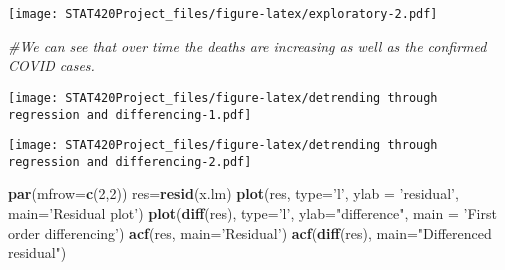 \documentclass[]{article}
\newenvironment{Shaded}{\begin{snugshade}}{\end{snugshade}}
\newcommand{\CommentTok}[1]{\textcolor[rgb]{0.56,0.35,0.01}{\textit{#1}}}
\newcommand{\DataTypeTok}[1]{\textcolor[rgb]{0.13,0.29,0.53}{#1}}
\newcommand{\DecValTok}[1]{\textcolor[rgb]{0.00,0.00,0.81}{#1}}
\newcommand{\KeywordTok}[1]{\textcolor[rgb]{0.13,0.29,0.53}{\textbf{#1}}}
\newcommand{\NormalTok}[1]{#1}
\newcommand{\OperatorTok}[1]{\textcolor[rgb]{0.81,0.36,0.00}{\textbf{#1}}}
\newcommand{\StringTok}[1]{\textcolor[rgb]{0.31,0.60,0.02}{#1}}
\begin{document}
\texttt{[image: STAT420Project\_files/figure-latex/exploratory-2.pdf]}

\begin{Shaded}
\begin{Highlighting}[]
\CommentTok{#We can see that over time the deaths are increasing as well as the confirmed COVID cases. }
\end{Highlighting}
\end{Shaded}

\begin{Shaded}
\end{Shaded}

\texttt{[image: STAT420Project\_files/figure-latex/detrending through regression and differencing-1.pdf]}

\begin{Shaded}
\end{Shaded}

\texttt{[image: STAT420Project\_files/figure-latex/detrending through regression and differencing-2.pdf]}

\begin{Shaded}
\begin{Highlighting}[]
\KeywordTok{par}\NormalTok{(}\DataTypeTok{mfrow=}\KeywordTok{c}\NormalTok{(}\DecValTok{2}\NormalTok{,}\DecValTok{2}\NormalTok{))}
\NormalTok{res=}\KeywordTok{resid}\NormalTok{(x.lm)}
\KeywordTok{plot}\NormalTok{(res, }\DataTypeTok{type=}\StringTok{'l'}\NormalTok{, }\DataTypeTok{ylab =} \StringTok{'residual'}\NormalTok{, }\DataTypeTok{main=}\StringTok{'Residual plot'}\NormalTok{)}
\KeywordTok{plot}\NormalTok{(}\KeywordTok{diff}\NormalTok{(res), }\DataTypeTok{type=}\StringTok{'l'}\NormalTok{, }\DataTypeTok{ylab=}\StringTok{"difference"}\NormalTok{, }\DataTypeTok{main =} \StringTok{'First order differencing'}\NormalTok{)}
\KeywordTok{acf}\NormalTok{(res, }\DataTypeTok{main=}\StringTok{'Residual'}\NormalTok{)}
\KeywordTok{acf}\NormalTok{(}\KeywordTok{diff}\NormalTok{(res), }\DataTypeTok{main=}\StringTok{"Differenced residual"}\NormalTok{)}
\end{Highlighting}
\end{Shaded}
\end{document}
